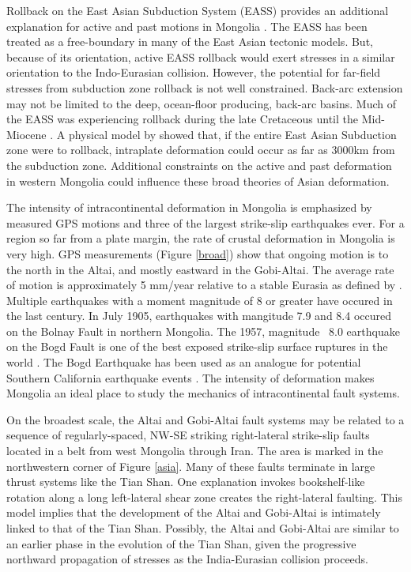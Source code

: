 	Rollback on the East Asian Subduction System (EASS) provides an additional explanation for active and past motions in Mongolia \citep{Schellart2005}. The EASS has been treated as a free-boundary in many of the East Asian tectonic models\citep{Tapponier1982}\citep{Peltzer1996}\citep{Houseman1993}. But, because of its orientation, active EASS rollback would exert stresses in a similar orientation to the Indo-Eurasian collision. However, the potential for far-field stresses from subduction zone rollback is not well constrained. Back-arc extension may not be limited to the deep, ocean-floor producing, back-arc basins. Much of the EASS was experiencing rollback during the late Cretaceous until the Mid-Miocene \citep{Northrup1995}\citep{Schellart2005a}. A physical model by \citet{Schellart2005} showed that, if the entire East Asian Subduction zone were to rollback, intraplate deformation could occur as far as 3000km from the subduction zone. Additional constraints on the active and past deformation in western Mongolia could influence these broad theories of Asian deformation.

	 The intensity of intracontinental deformation in Mongolia is emphasized by measured GPS motions and three of the largest strike-slip earthquakes ever. For a region so far from a plate margin, the rate of crustal deformation in Mongolia is very high. GPS measurements (Figure \ref{broad}) show that ongoing motion is to the north in the Altai, and mostly eastward in the Gobi-Altai\citep{Calais2003}. The average rate of motion is approximately 5 mm/year relative to a stable Eurasia as defined by \citet{Calais2003}. Multiple earthquakes with a moment magnitude of 8 or greater have occured in the last century. In July 1905, earthquakes with mangitude 7.9 and 8.4 occured on the Bolnay Fault in northern Mongolia. The 1957, magnitude ~8.0 earthquake on the Bogd Fault is one of the best exposed strike-slip surface ruptures in the world\citep{Kurushin1998} \citep{Okal1976a} \citep{Pollitz2003}. The Bogd Earthquake has been used as an analogue for potential Southern California earthquake events \citep{Bayarsayhan1996}.  The intensity of deformation makes Mongolia an ideal place to study the mechanics of intracontinental fault systems.
	
	On the broadest scale, the Altai and Gobi-Altai fault systems may be related to a sequence of regularly-spaced, NW-SE striking right-lateral strike-slip faults \citep{Yin2010} located in a belt from west Mongolia through Iran. The area is marked in the northwestern corner of Figure \ref{asia}. Many of these faults terminate in large thrust systems like the Tian Shan. One explanation invokes bookshelf-like rotation along a long left-lateral shear zone creates the right-lateral faulting. \citep{Davy1998} \citep{Bayasgalan2005a}  This model implies that the development of the Altai and Gobi-Altai is intimately linked to that of the Tian Shan. Possibly, the Altai and Gobi-Altai are similar to an earlier phase in the evolution of the Tian Shan, given the progressive northward propagation of stresses as the India-Eurasian collision proceeds.

